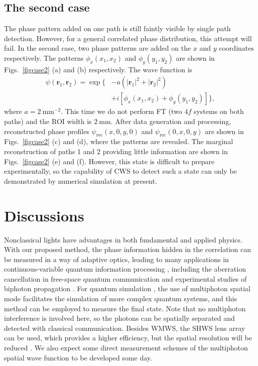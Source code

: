 \documentclass[pra,english,reprint,nofootinbib,aps,superscriptaddress,showpacs,showkeys]{revtex4-2}
\theoremstyle{definition}
\theoremstyle{remark}
\begin{document}
	\subsection{The second case}
	The phase pattern added on one path is still faintly visible by single path detection. However, for a general correlated phase distribution, this attempt will fail. In the second case, two phase patterns are added on the $x$ and $y$ coordinates respectively. The patterns $\phi_x(x_1,x_2)$ and $\phi_y(y_1,y_2)$ are shown in Figs.~\ref{figcase2} (a) and (b) respectively. The wave function is 
	\begin{align}\label{c2state}
		\psi(\mathbf{r}_1,\mathbf{r}_2)=\exp\big\{&-a(|\mathbf{r}_1|^2+|\mathbf{r}_2|^2)\nonumber\\
		&+i[\phi_x(x_1,x_2)+\phi_y(y_1,y_2)]\big\},
	\end{align}
	where $a=2~\textrm{mm}^{-2}$. This time we do not perform FT (two $4f$ systems on both paths) and the ROI width is $2~\textrm{mm}$. After data generation and processing, reconstructed phase profiles $\psi_\textrm{rec}(x,0,y,0)$ and $\psi_\textrm{rec}(0,x,0,y)$ are shown in Figs.~\ref{figcase2} (c) and (d), where the patterns are revealed. The marginal reconstruction of paths 1 and 2 providing little information are shown in Figs.~\ref{figcase2} (e) and (f). However, this state is difficult to prepare experimentally, so the capability of CWS to detect such a state can only be demonstrated by numerical simulation at present.
	
	\section{Discussions}
	
	Nonclassical lights have advantages in both fundamental \cite{corrreview} and applied physics. With our proposed method, the phase information hidden in the correlation can be measured in a way of adaptive optics, leading to many applications in continuous-variable quantum information processing \cite{cvq}, including the aberration cancellation in free-space quantum communication and experimental studies of biphoton propagation \cite{wolf,Chan2007}. For quantum simulation \cite{simuRMP}, the use of multiphoton spatial mode facilitates the simulation of more complex quantum systems, and this method can be employed to measure the final state. Note that no multiphoton interference is involved here, so the photons can be spatially separated and detected with classical communication. Besides WMWS, the SHWS lens array can be used, which provides a higher efficiency, but the spatial resolution will be reduced \cite{Zheng2021,Zheng2022}. We also expect some direct measurement schemes \cite{Lundeen11,Shi2015} of the multiphoton spatial wave function to be developed some day.
	
\end{document}

